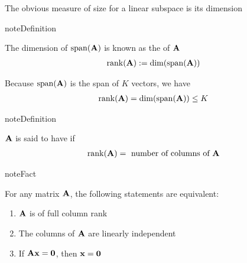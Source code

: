 \documentclass[letterpaper,10pt,english]{jupyterBook}
\begin{document}
\sphinxAtStartPar
The obvious measure of size for a linear subspace is its dimension

\begin{sphinxadmonition}{note}{Definition}

\sphinxAtStartPar
The dimension of \(\mathrm{span}({\bf A})\) is known as the  of \({\bf A}\)
\begin{equation*}
\begin{split}
%
\mathrm{rank}({\bf A}) := \mathrm{dim}(\mathrm{span}({\bf A}))
%
\end{split}
\end{equation*}\end{sphinxadmonition}

\sphinxAtStartPar
Because \(\mathrm{span}({\bf A})\) is the span of \(K\) vectors, we have
\begin{equation*}
\begin{split}
%
\mathrm{rank}({\bf A}) = \mathrm{dim}(\mathrm{span}({\bf A})) \leq K
%
\end{split}
\end{equation*}
\begin{sphinxadmonition}{note}{Definition}

\sphinxAtStartPar
\({\bf A}\) is said to have  if
\begin{equation*}
\begin{split}
%
\mathrm{rank}({\bf A}) = \text{ number of columns of } {\bf A}
%
\end{split}
\end{equation*}\end{sphinxadmonition}

\begin{sphinxadmonition}{note}{Fact}

\sphinxAtStartPar
For any matrix \({\bf A}\), the following statements are equivalent:
\begin{enumerate}
%
\item {} 
\sphinxAtStartPar
\({\bf A}\) is of full column rank

\item {} 
\sphinxAtStartPar
The columns of \({\bf A}\) are linearly independent

\item {} 
\sphinxAtStartPar
If \({\bf A} {\bf x} = {\bf 0}\), then \({\bf x} = {\bf 0}\)

\end{enumerate}
\end{sphinxadmonition}
\end{document}

